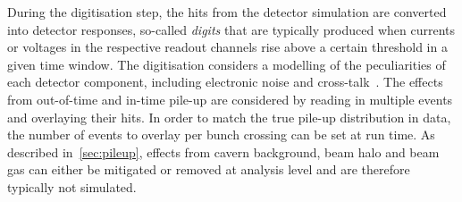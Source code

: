 During the digitisation step, the hits from the detector simulation are converted into detector responses, so-called \textit{digits} that are typically produced when currents or voltages in the respective readout channels rise above a certain threshold in a given time window. The digitisation considers a modelling of the peculiarities of each detector component, including electronic noise and cross-talk~\cite{Aad:2010ah}. The effects from out-of-time and in-time pile-up are considered by reading in multiple events and overlaying their hits. In order to match the true pile-up distribution in data, the number of events to overlay per bunch crossing can be set at run time. As described in~\cref{sec:pileup}, effects from cavern background, beam halo and beam gas can either be mitigated or removed at analysis level and are therefore typically not simulated. 

%






























 